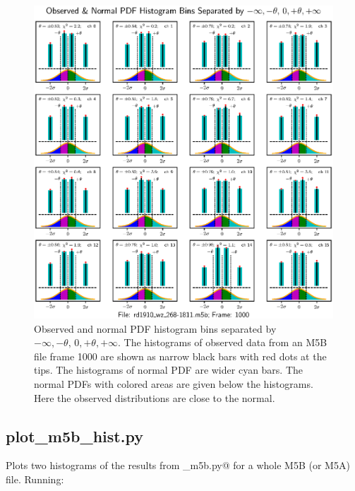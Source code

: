 \documentclass[letterpaper,twoside,12pt]{article}
\begin{document}
\begin{figure}[ht!]
  \begin{center}
  \includegraphics[width=40pc]{fig_4x4_Histograms_good.eps}
  \caption{\small Observed and normal PDF histogram bins separated by $-\infty, -\theta, \, 0, +\theta, +\infty$. The histograms of observed data from an M5B file frame 1000 are shown as narrow black bars with red dots at the tips. The histograms of normal PDF are wider cyan bars. The normal PDFs with colored areas are given below the histograms. Here the observed distributions are close to the normal.}
  \label{hists_good_4x4}
  \end{center}
\end{figure}



\subsection{plot\_m5b\_hist.py}

Plots two histograms of the results from \verb@gpu_m5b.py@ for a whole M5B (or M5A) file.  Running: \\

\noindent \verb@%run plot_m5b_hist.py <M5B file name> <timestamp> @ \\
\end{document}
